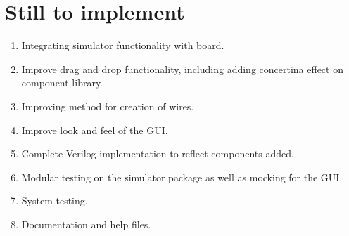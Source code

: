 \documentclass[12pt, a4paper, oneside,titlepage]{article}
\begin{document}
\section{Still to implement}
\begin{enumerate}
\item Integrating simulator functionality with board.
\item Improve drag and drop functionality, including adding concertina effect on component library. 
\item Improving method for creation of wires. 
\item Improve look and feel of the GUI.
\item Complete Verilog implementation to reflect components added. 
\item Modular testing on the simulator package as well as mocking for the GUI. 
\item System testing. 
\item Documentation and help files. 
\end{enumerate}
\end{document}
